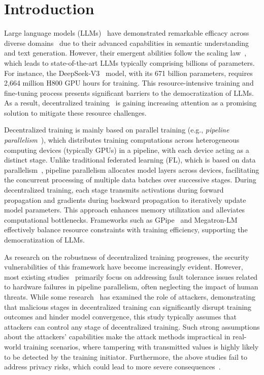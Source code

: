 \section{Introduction}

Large language models (LLMs)~\cite{gpt3, chen2023extending, mistral, gemma2} have demonstrated remarkable efficacy across diverse domains~\cite{li2024ecomgpt, wu2024chateda, lu2024chameleon} due to their advanced capabilities in semantic understanding and text generation. However, their emergent abilities follow the scaling law~\cite{bahri2024explaining, naveed2023comprehensive, raiaan2024review}, which leads to state-of-the-art LLMs typically comprising billions of parameters. For instance, the DeepSeek-V3~\cite{liu2024deepseek} model, with its 671 billion parameters, requires 2,664 million H800 GPU hours for training. This resource-intensive training and fine-tuning process presents significant barriers to the democratization of LLMs. As a result, decentralized training~\cite{yuan2022decentralized, ryabinin2023swarm} is gaining increasing attention as a promising solution to mitigate these resource challenges.

Decentralized training is mainly based on parallel training (e.g., \textit{pipeline parallelism}~\cite{narayanan2019pipedream}), which distributes training computations across heterogeneous computing devices (typically GPUs) in a pipeline, with each device acting as a distinct stage. Unlike traditional federated learning (FL), which is based on data parallelism~\cite{li2014scaling, luo2020prague}, pipeline parallelism allocates model layers across devices, facilitating the concurrent processing of multiple data batches over successive stages. During decentralized training, each stage transmits activations during forward propagation and gradients during backward propagation to iteratively update model parameters. This approach enhances memory utilization and alleviates computational bottlenecks. Frameworks such as GPipe~\cite{huang2019gpipe} and Megatron-LM~\cite{narayanan2021efficient} effectively balance resource constraints with training efficiency, supporting the democratization of LLMs.

As research on the robustness of decentralized training progresses, the security vulnerabilities of this framework have become increasingly evident. However, most existing studies~\cite{thorpe2023bamboo, jang2023oobleck, duan2024parcae} primarily focus on addressing fault tolerance issues related to hardware failures in pipeline parallelism, often neglecting the impact of human threats. While some research~\cite{lu2024position} has examined the role of attackers, demonstrating that malicious stages in decentralized training can significantly disrupt training outcomes and hinder model convergence, this study typically assumes that attackers can control any stage of decentralized training. Such strong assumptions about the attackers' capabilities make the attack methods impractical in real-world training scenarios, where tampering with transmitted values is highly likely to be detected by the training initiator. Furthermore, the above studies fail to address privacy risks, which could lead to more severe consequences~\cite{bethany2024large}.

